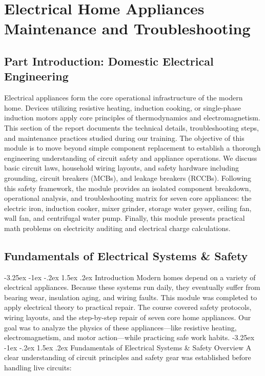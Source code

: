\documentclass[11pt,a4paper]{report}
\makeatletter
\renewcommand{\section}{\@startsection{section}{1}{\z@}%
  {-3.25ex \@plus -1ex \@minus -.2ex}%
  {1.5ex \@plus.2ex}%
  {\normalfont\Large\bfseries\color{primaryColor}}}
\makeatother
\begin{document}
\part{Electrical Home Appliances Maintenance and Troubleshooting}
\chapter*{Part Introduction: Domestic Electrical Engineering}
Electrical appliances form the core operational infrastructure of the modern home. Devices utilizing resistive heating, induction cooking, or single-phase induction motors apply core principles of thermodynamics and electromagnetism. This section of the report documents the technical details, troubleshooting steps, and maintenance practices studied during our training. The objective of this module is to move beyond simple component replacement to establish a thorough engineering understanding of circuit safety and appliance operations. We discuss basic circuit laws, household wiring layouts, and safety hardware including grounding, circuit breakers (MCBs), and leakage breakers (RCCBs). Following this safety framework, the module provides an isolated component breakdown, operational analysis, and troubleshooting matrix for seven core appliances: the electric iron, induction cooker, mixer grinder, storage water geyser, ceiling fan, wall fan, and centrifugal water pump. Finally, this module presents practical math problems on electricity auditing and electrical charge calculations.
\chapter{Fundamentals of Electrical Systems \& Safety}
\section{Introduction}
Modern homes depend on a variety of electrical appliances. Because these systems run daily, they eventually suffer from bearing wear, insulation aging, and wiring faults. This module was completed to apply electrical theory to practical repair. The course covered safety protocols, wiring layouts, and the step-by-step repair of seven core home appliances. Our goal was to analyze the physics of these appliances—like resistive heating, electromagnetism, and motor action—while practicing safe work habits.
\section{Fundamentals of Electrical Systems \& Safety Overview}
A clear understanding of circuit principles and safety gear was established before handling live circuits:
\end{document}
